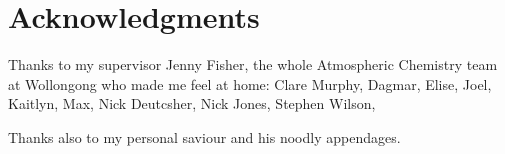 \chapter*{Acknowledgments}

  Thanks to my supervisor Jenny Fisher, the whole Atmospheric Chemistry team at Wollongong who made me feel at home: Clare Murphy, Dagmar, Elise, Joel, Kaitlyn, Max, Nick Deutcsher, Nick Jones, Stephen Wilson, 

  Thanks also to my personal saviour and his noodly appendages.
